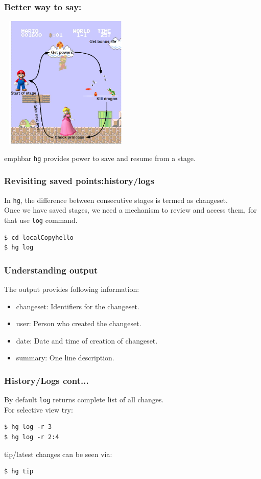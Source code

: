 \documentclass[14pt,compress]{beamer}
\newcommand{\emphbar}[1]
{\begin{beamercolorbox}[rounded=true]{emphbar} 
      {#1}
 \end{beamercolorbox}
}
\newcounter{time}
\newcommand{\inctime}[1]{\addtocounter{time}{#1}{\tiny \thetime\ m}}
\newcommand{\typ}[1]{\lstinline{#1}}
\begin{document}
\begin{frame}[fragile]
  \frametitle{Better way to say:}
  \begin{center}
    \includegraphics[height=2.5in,width=2.5in, interpolate=true]{mario}
  \end{center}  
  \emphbar{\typ{hg} provides power to save and resume from a stage.}
\end{frame}

\begin{frame}[fragile]
  \frametitle{Revisiting saved points:history/logs}
  In \typ{hg}, the difference between consecutive stages is termed as changeset.\\
  Once we have saved stages, we need a mechanism to review and access them, for that use \typ{log} command.
  \begin{lstlisting}
$ cd localCopyhello
$ hg log    
  \end{lstlisting}
\end{frame}

\begin{frame}[fragile]
  \frametitle{Understanding output}
  The output provides following information:
  \begin{itemize}
  \item changeset: Identifiers for the changeset.
  \item user: Person who created the changeset.
  \item date: Date and time of creation of changeset.
  \item summary: One line description.
  \end{itemize}
\end{frame}

\begin{frame}[fragile]
  \frametitle{History/Logs cont...}
  By default \typ{log} returns complete list of all changes. \\
  For selective view try:
\begin{lstlisting}
$ hg log -r 3
$ hg log -r 2:4
\end{lstlisting}
  tip/latest changes can be seen via:
  \begin{lstlisting}
$ hg tip    
  \end{lstlisting} %
  \inctime{10}
\end{frame}
\end{document}
